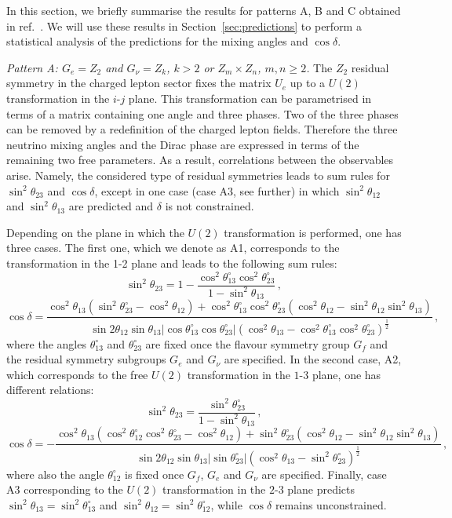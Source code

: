 \documentclass[11pt,a4paper]{article}
\newcommand{\be}{\begin{equation}}
\newcommand{\ee}{\end{equation}}
\def\th{\theta}
\numberwithin{equation}{section}
\begin{document}
 In this section, we briefly summarise the results for patterns A, B and C 
obtained in ref.~\cite{Girardi:2015rwa}. We will use these results 
in Section~\ref{sec:predictions} 
to perform a statistical analysis of the predictions 
for the mixing angles and $\cos\delta$.

 \textit{Pattern A: $G_e = Z_2$ and $G_{\nu} = Z_k$, $k > 2$ 
or $Z_m \times Z_n$, $m,n \geq 2$.}
The $Z_2$ residual symmetry in the charged lepton sector fixes the matrix $U_e$ 
up to a $U(2)$ transformation in the $i$-$j$ plane. 
This transformation can be parametrised in terms of a matrix containing 
one angle and three phases. Two of the three phases 
can be removed by a redefinition of the charged lepton fields. 
Therefore the three neutrino mixing angles and the Dirac phase 
are expressed in terms of the remaining two free parameters. 
As a result, correlations between the observables arise.
Namely, the considered type of residual symmetries leads to 
sum rules for $\sin^2\th_{23}$ and $\cos\delta$,
except in one case (case A3, see further) in which 
$\sin^2\th_{12}$ and $\sin^2\th_{13}$ are predicted and 
$\delta$ is not constrained.

 Depending on the plane in which the $U(2)$ transformation is performed, 
one has three cases. The first one, which we denote as A1, 
corresponds to the transformation 
in the 1-2 plane and leads to the following sum rules:
\be
\sin^2 \theta_{23} = 1 -
\frac{\cos^2 \theta^{\circ}_{13} \cos^2 \theta^{\circ}_{23}}{1-\sin^2\th_{13}}\,,
\label{eq:ss23A1}
\ee
%
\be
\cos \delta = \frac{\cos^2 \theta_{13} (\sin^2 \theta^{\circ}_{23} - \cos^2 \theta_{12}) + \cos^2 \theta^{\circ}_{13} \cos^2 \theta^{\circ}_{23} (\cos^2 \theta_{12} - \sin^2 \theta_{12} \sin^2 \theta_{13})}{\sin 2 \theta_{12} \sin \theta_{13} |\cos \theta^{\circ}_{13} \cos \theta^{\circ}_{23}| (\cos^2 \theta_{13} - \cos^2 \theta^{\circ}_{13} \cos^2 \theta^{\circ}_{23})^{\frac{1}{2}}}\,,
\label{eq:cosdeltaA1}
\ee
%
where the angles $\th^\circ_{13}$ and $\th^\circ_{23}$ are fixed 
once the flavour symmetry group $G_f$ and 
the residual symmetry subgroups $G_e$ and $G_\nu$ are specified.
In the second case, A2, which corresponds to the free $U(2)$ transformation 
in the $1$-$3$ plane, one has different relations: 
\be
\sin^2 \theta_{23} = \frac{\sin^2 \theta^{\circ}_{23}}{1 - \sin^2 \theta_{13}}\,, 
\label{eq:ss23A2}
\ee
\be
\cos \delta = -\frac{\cos^2 \theta_{13} (\cos^2 \theta^{\circ}_{12} \cos^2 \theta^{\circ}_{23} - \cos^2 \theta_{12}) + \sin^2 \theta^{\circ}_{23} (\cos^2 \theta_{12} - \sin^2 \theta_{12} \sin^2 \theta_{13})}{\sin 2 \theta_{12} \sin \theta_{13} |\sin \theta^{\circ}_{23}| (\cos^2 \theta_{13} - \sin^2 \theta^{\circ}_{23})^{\frac{1}{2}}}\,,
\label{eq:cosdeltaA2}
\ee
%
where also the angle $\theta^{\circ}_{12}$ is  fixed 
once $G_f$, $G_e$ and $G_\nu$ are specified.
Finally, case A3 corresponding to the $U(2)$ transformation 
in the $2$-$3$ plane predicts 
$\sin^2\th_{13} = \sin^2\th^\circ_{13}$ and $\sin^2\th_{12} = \sin^2\th^\circ_{12}$, 
while $\cos\delta$ remains unconstrained.
\end{document}

